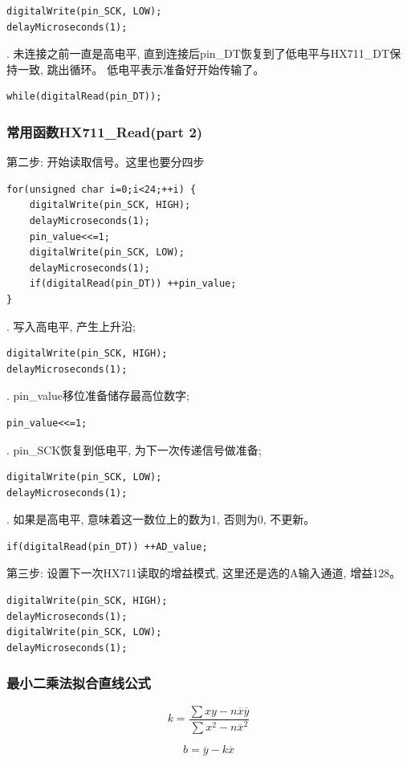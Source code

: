 \documentclass{article}
\begin{document}
\begin{lstlisting}
digitalWrite(pin_SCK, LOW);
delayMicroseconds(1);
\end{lstlisting}

\noindent \uppercase\expandafter{}. 未连接之前一直是高电平, 直到连接后pin\_DT恢复到了低电平与HX711\_DT保持一致, 跳出循环。
低电平表示准备好开始传输了。
\begin{lstlisting}
while(digitalRead(pin_DT));
\end{lstlisting}

\subsubsection{常用函数HX711\_Read(part 2)}
\noindent 第二步: 开始读取信号。这里也要分四步
\begin{lstlisting}
for(unsigned char i=0;i<24;++i) {
	digitalWrite(pin_SCK, HIGH); 
	delayMicroseconds(1);
	pin_value<<=1; 
	digitalWrite(pin_SCK, LOW); 
	delayMicroseconds(1);
	if(digitalRead(pin_DT)) ++pin_value; 
} 
\end{lstlisting}

\noindent \uppercase\expandafter{}. 写入高电平, 产生上升沿;

\begin{lstlisting}
digitalWrite(pin_SCK, HIGH); 
delayMicroseconds(1);
\end{lstlisting}

\noindent \uppercase\expandafter{}. pin\_value移位准备储存最高位数字;

\begin{lstlisting}
pin_value<<=1; 
\end{lstlisting}

\noindent \uppercase\expandafter{}. pin\_SCK恢复到低电平, 为下一次传递信号做准备;

\begin{lstlisting}
digitalWrite(pin_SCK, LOW); 
delayMicroseconds(1);
\end{lstlisting}

\noindent \uppercase\expandafter{}. 如果是高电平, 意味着这一数位上的数为1, 否则为0, 不更新。

\begin{lstlisting}
if(digitalRead(pin_DT)) ++AD_value; 
\end{lstlisting}

\noindent 第三步: 设置下一次HX711读取的增益模式, 这里还是选的A输入通道, 增益128。

\begin{lstlisting}
digitalWrite(pin_SCK, HIGH); 
delayMicroseconds(1);
digitalWrite(pin_SCK, LOW); 
delayMicroseconds(1);
\end{lstlisting}

\subsubsection{最小二乘法拟合直线公式}
\begin{equation}
	k = \frac{\sum xy - n\overline{x}\overline{y}}{\sum x^2 - n \overline{x}^2}
\end{equation}

\begin{equation}
	b = \overline{y}- k \overline{x}
\end{equation}
\end{document}

